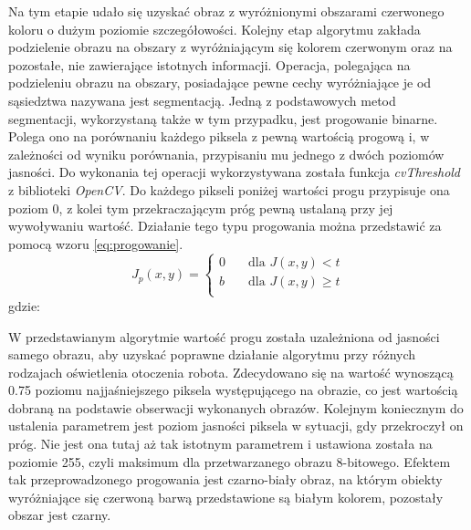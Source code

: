 Na tym etapie udało się uzyskać obraz z wyróżnionymi obszarami czerwonego koloru o dużym poziomie szczegółowości. Kolejny etap algorytmu zakłada podzielenie obrazu na obszary z wyróżniającym się kolorem czerwonym oraz na pozostałe, nie zawierające istotnych informacji. Operacja, polegająca na podzieleniu obrazu na obszary, posiadające pewne cechy wyróżniające je od sąsiedztwa nazywana jest segmentacją\cite{Malina}. Jedną z podstawowych metod segmentacji, wykorzystaną także w tym przypadku, jest progowanie binarne. Polega ono na porównaniu każdego piksela z pewną wartością progową i, w zależności od wyniku porównania, przypisaniu mu jednego z dwóch poziomów jasności. Do wykonania tej operacji wykorzystywana została funkcja \textit{cvThreshold} z biblioteki \textit{OpenCV}. Do każdego pikseli poniżej wartości progu przypisuje ona poziom 0, z kolei tym przekraczającym próg pewną ustalaną przy jej wywoływaniu wartość. Działanie tego typu progowania można przedstawić za pomocą wzoru \ref{eq:progowanie}.
\begin{equation}
J_p(x, y) =
  \begin{cases}
    0	& \quad \text{dla } J(x, y) < t\\
    b	& \quad \text{dla } J(x, y) \geq t\\
  \end{cases}
\label{eq:progowanie}
\end{equation}
gdzie:
\begin{equationDescriptor}
\end{equationDescriptor}
W przedstawianym algorytmie wartość progu została uzależniona od jasności samego obrazu, aby uzyskać poprawne działanie algorytmu przy różnych rodzajach oświetlenia otoczenia robota. Zdecydowano się na wartość wynoszącą 0.75 poziomu najjaśniejszego piksela występującego na obrazie, co jest wartością dobraną na podstawie obserwacji wykonanych obrazów. Kolejnym koniecznym do ustalenia parametrem jest poziom jasności piksela w sytuacji, gdy przekroczył on próg. Nie jest ona tutaj aż tak istotnym parametrem i ustawiona została na poziomie 255, czyli maksimum dla przetwarzanego obrazu 8-bitowego. Efektem tak przeprowadzonego progowania jest czarno-biały obraz, na którym obiekty wyróżniające się czerwoną barwą przedstawione są białym kolorem, pozostały obszar jest czarny.

